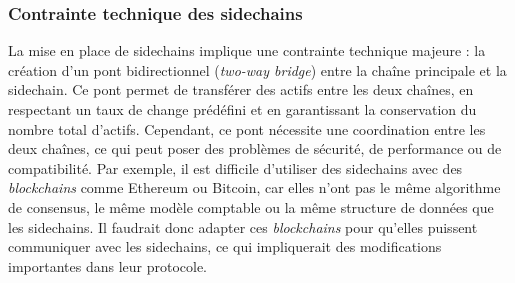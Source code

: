 \subsubsection{Contrainte technique des sidechains}
La mise en place de sidechains implique une contrainte technique majeure : la création d'un pont bidirectionnel (\textit{two-way bridge}) entre la chaîne principale et la sidechain. Ce pont permet de transférer des actifs entre les deux chaînes, en respectant un taux de change prédéfini et en garantissant la conservation du nombre total d'actifs. Cependant, ce pont nécessite une coordination entre les deux chaînes, ce qui peut poser des problèmes de sécurité, de performance ou de compatibilité. Par exemple, il est difficile d'utiliser des sidechains avec des \textit{blockchains} comme Ethereum ou Bitcoin, car elles n'ont pas le même algorithme de consensus, le même modèle comptable ou la même structure de données que les sidechains. Il faudrait donc adapter ces \textit{blockchains} pour qu'elles puissent communiquer avec les sidechains, ce qui impliquerait des modifications importantes dans leur protocole.
